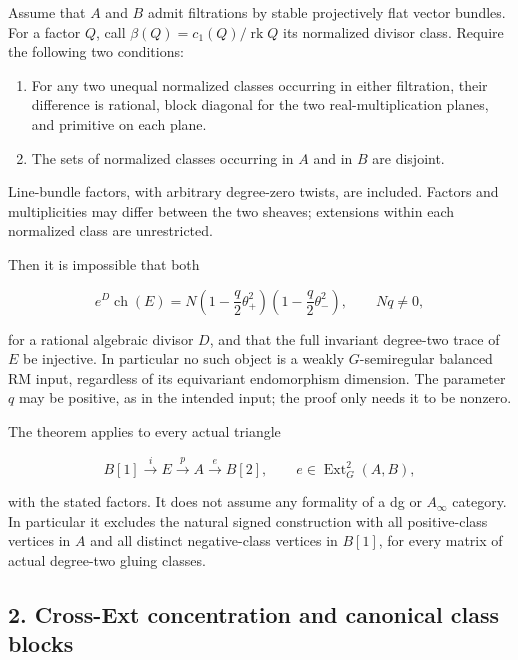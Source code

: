 Assume that \(A\) and \(B\) admit filtrations by stable projectively
flat vector bundles. For a factor \(Q\), call
\(\beta(Q)=c_1(Q)/\operatorname{rk}Q\) its normalized divisor class.
Require the following two conditions:

\begin{enumerate}
\def\labelenumi{\arabic{enumi}.}
\item
  For any two unequal normalized classes occurring in either filtration,
  their difference is rational, block diagonal for the two
  real-multiplication planes, and primitive on each plane.
\item
  The sets of normalized classes occurring in \(A\) and in \(B\) are
  disjoint.
\end{enumerate}

Line-bundle factors, with arbitrary degree-zero twists, are included.
Factors and multiplicities may differ between the two sheaves;
extensions within each normalized class are unrestricted.

Then it is impossible that both

\[
 e^D\operatorname{ch}(E)
  =N\left(1-\frac q2\theta_+^2\right)
      \left(1-\frac q2\theta_-^2\right),
 \qquad Nq\ne0,
 \tag{E816.2}
\]

for a rational algebraic divisor \(D\), and that the full invariant
degree-two trace of \(E\) be injective. In particular no such object is
a weakly \(G\)-semiregular balanced RM input, regardless of its
equivariant endomorphism dimension. The parameter \(q\) may be positive,
as in the intended input; the proof only needs it to be nonzero.

The theorem applies to every actual triangle

\[
 B[1]\xrightarrow{i}E\xrightarrow{p}A
       \xrightarrow{e}B[2],
 \qquad e\in\operatorname{Ext}^2_G(A,B),
 \tag{E816.3}
\]

with the stated factors. It does not assume any formality of a dg or
\(A_\infty\) category. In particular it excludes the natural signed
construction with all positive-class vertices in \(A\) and all distinct
negative-class vertices in \(B[1]\), for every matrix of actual
degree-two gluing classes.

\subsection{2. Cross-Ext concentration and canonical class
blocks}\label{SF-E816-cross-ext-concentration-and-canonical-class-blocks}

